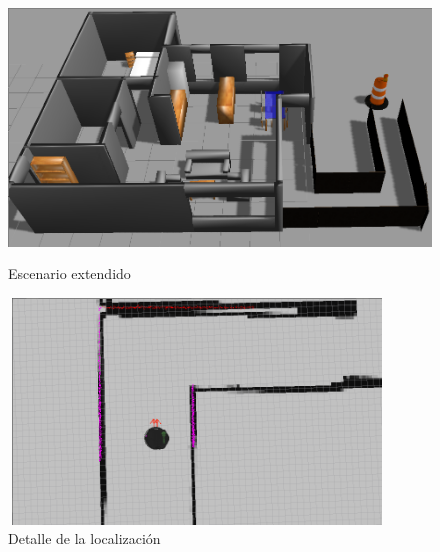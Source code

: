\begin{figure}[hbtp]
  \begin{center}
    \includegraphics[width=12cm,height=7cm]{img/cap5/grannieAnne-ext}
  \end{center}
  \caption{Escenario extendido}
  \label{fig:grannieAnne-ext}
\end{figure}

\begin{figure}[hbtp]
  \begin{center}
    \includegraphics[width=10cm,height=6cm]{img/cap5/localization-ext}
  \end{center}
  \caption{Detalle de la localización}
  \label{fig:localization-ext}
\end{figure}


